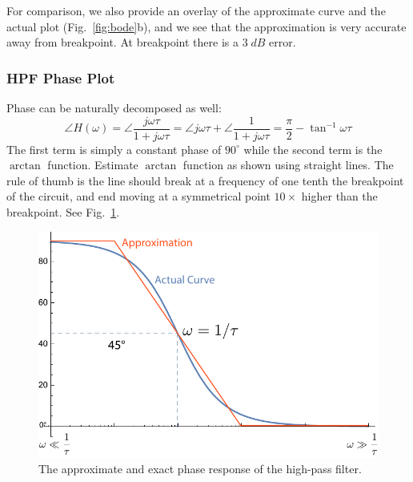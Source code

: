 For comparison, we also provide an overlay of the approximate curve and the actual plot (Fig.~\ref{fig:bode}b), and we see that the approximation is very accurate away from breakpoint.   At breakpoint there is a $3\;dB$ error.
\subsubsection{HPF Phase Plot}
Phase can be naturally decomposed as well:
    \begin{equation}
        \angle H(\omega ) = \angle \frac{{j\omega \tau }}{{1 + j\omega \tau }} = \angle j\omega \tau + \angle \frac{1}{{1 + j\omega \tau }} = \frac{\pi }{2} - {\tan ^{ - 1}}\omega \tau
    \end{equation}
The first term is simply a constant phase of $90^\circ$ while the second term is the $\arctan$ function.  Estimate $\arctan$ function as shown using straight lines.  The rule of thumb is the line should break at a frequency of one tenth the breakpoint of the circuit, and end moving at a symmetrical point $10\times$ higher than the breakpoint.  See Fig.~\ref{fig:bode_phase}.
\begin{figure}[tb]
\begin{center}
\includegraphics[width=.55\columnwidth]{mod1_3_12_bode4}
\end{center}
\caption{The approximate and exact phase response of the high-pass filter.}
\label{fig:bode_phase}
\end{figure}
